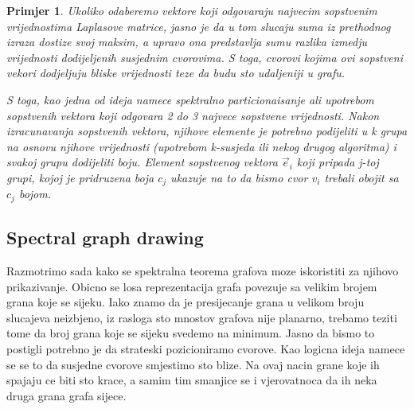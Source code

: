 \documentclass[11pt]{article}
\newtheorem{example}{Primjer}
\begin{document}
\begin{example}
        Ukoliko odaberemo vektore koji odgovaraju najvecim sopstvenim vrijednostima Laplasove matrice, jasno je da u tom slucaju suma iz prethodnog izraza
        dostize svoj maksim, a upravo ona predstavlja sumu razlika izmedju vrijednosti dodijeljenih susjednim cvorovima. S toga, cvorovi kojima ovi sopstveni 
        vekori dodjeljuju bliske vrijednosti teze da budu sto udaljeniji u grafu.

        S toga, kao jedna od ideja namece spektralno particionaisanje ali upotrebom sopstvenih vektora koji odgovara 2 do 3 najvece sopstvene vrijednosti.
        Nakon izracunavanja sopstvenih vektora, njihove elemente je potrebno podijeliti u k grupa na osnovu njihove vrijednosti (upotrebom k-susjeda ili nekog drugog algoritma) i svakoj grupu dodijeliti boju.
        Element sopstvenog vektora $\vec{e}_i$ koji pripada j-toj grupi, kojoj je pridruzena boja $c_j$ ukazuje na to da bismo cvor $v_i$ trebali obojit sa $c_j$ bojom.

    \end{example}

    \subsection{Spectral graph drawing}

	Razmotrimo sada kako se spektralna teorema grafova moze iskoristiti za njihovo prikazivanje. Obicno se losa reprezentacija grafa povezuje sa velikim brojem grana koje se sijeku.
	Iako znamo da je presijecanje grana u velikom broju slucajeva neizbjeno, iz rasloga sto mnostov grafova nije planarno, trebamo teziti tome da broj grana koje se sijeku svedemo na minimum.
    Jasno da bismo to postigli potrebno je da strateski pozicioniramo cvorove. Kao logicna ideja namece se se to da susjedne cvorove smjestimo sto blize. Na ovaj nacin grane koje ih spajaju ce biti sto krace, a samim tim smanjice se i vjerovatnoca da ih neka druga grana grafa sijece.
    
\end{document}
